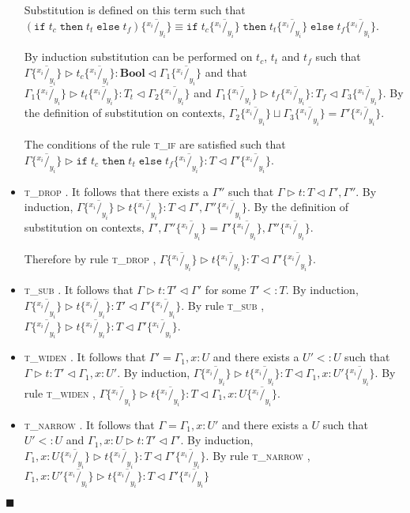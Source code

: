 \documentclass[preprint]{sigplanconf}
\newcommand{\tif}{\textsc{t\_if} }
\newcommand{\tdrop}{\textsc{t\_drop} }
\newcommand{\tsub}{\textsc{t\_sub} }
\newcommand{\tnarrow}{\textsc{t\_narrow} }
\newcommand{\twiden}{\textsc{t\_widen} }
\newcommand{\typerule}[4]{#1 \triangleright #2 : #3 \triangleleft #4}
\newcommand{\subst}[3]{#3 \{\overline{^{#1}/_{#2}}\}}
\newcommand{\substxy}[1]{\subst{x_i}{y_i}{#1}}
\newcommand{\boolt}{\mathbf{Bool}}
\newcommand{\ift}[3]{\mathtt{if} \; #1 \; \mathtt{then} \; #2 \; \mathtt{else} \; #3}
\newcommand{\qed}{$\blacksquare$}
\newenvironment{proof}{\vspace{1ex}\noindent{\bf Proof}\hspace{0.5em}}
  {\hfill\qed\vspace{1ex}}
\begin{document}
\begin{proof}
\begin{itemize}
Substitution is defined on this term such
that \\
$\subst{x_i}{y_i}{(\ift{t_c}{t_t}{t_f})} \equiv 
\ift{\substxy{t_c}}{\substxy{t_t}}{\substxy{t_f}}$.

By induction
substitution can be performed on $t_c$, $t_t$ and $t_f$ such that
$\typerule{\substxy{\Gamma}}{\substxy{t_c}}{\boolt}{\substxy{\Gamma_1}}$ and that
$\typerule{\substxy{\Gamma_1}}{\substxy{t_t}}{T_t}{\substxy{\Gamma_2}}$ and
$\typerule{\substxy{\Gamma_1}}{\substxy{t_f}}{T_f}{\substxy{\Gamma_3}}$.
By the definition of substitution on contexts, 
$\substxy{\Gamma_2} \sqcup \substxy{\Gamma_3} = \substxy{\Gamma'}$. 

The conditions of the rule \tif are satisfied such that
$\typerule{\substxy{\Gamma}}{\substxy{\ift{t_c}{t_t}{t_f}}}{T}{\substxy{\Gamma'}}$.

\item \tdrop. It follows that there exists a $\Gamma''$ such that
$\typerule{\Gamma}{t}{T}{\Gamma', \Gamma''}$. By induction,
$\typerule{\substxy{\Gamma}}{\substxy{t}}{T}{\substxy{\Gamma', \Gamma''}}$.
By the definition of substitution on contexts,
$\substxy{\Gamma', \Gamma''} = \substxy{\Gamma'}, \substxy{\Gamma''}$.

Therefore by rule \tdrop,
$\typerule{\substxy{\Gamma}}{\substxy{t}}{T}{\substxy{\Gamma'}}$.

\item \tsub. It follows that
$\typerule{\Gamma}{t}{T'}{\Gamma'}$ for some $T' <: T$. By induction,
$\typerule{\substxy{\Gamma}}{\substxy{t}}{T'}{\substxy{\Gamma'}}$.
By rule \tsub,
$\typerule{\substxy{\Gamma}}{\substxy{t}}{T}{\substxy{\Gamma'}}$.

\item \twiden. It follows that $\Gamma' = \Gamma_1, x : U$
and there exists a $U' <: U$ such that
$\typerule{\Gamma}{t}{T'}{\Gamma_1, x : U'}$. 
By induction,
$\typerule{\substxy{\Gamma}}{\substxy{t}}{T}{\substxy{\Gamma_1, x : U'}}$.
By rule \twiden,
$\typerule{\substxy{\Gamma}}{\substxy{t}}{T}{\substxy{\Gamma_1, x : U}}$.

\item \tnarrow. It follows that $\Gamma = \Gamma_1, x : U'$
and there exists a $U$ such that $U' <: U$ and
$\typerule{\Gamma_1, x : U}{t}{T'}{\Gamma'}$.
By induction,
$\typerule{\substxy{\Gamma_1, x : U}}{\substxy{t}}{T}{\substxy{\Gamma'}}$.
By rule \tnarrow,
$\typerule{\substxy{\Gamma_1, x : U'}}{\substxy{t}}{T}{\substxy{\Gamma'}}$

\end{itemize}
\end{proof}
\end{document}
